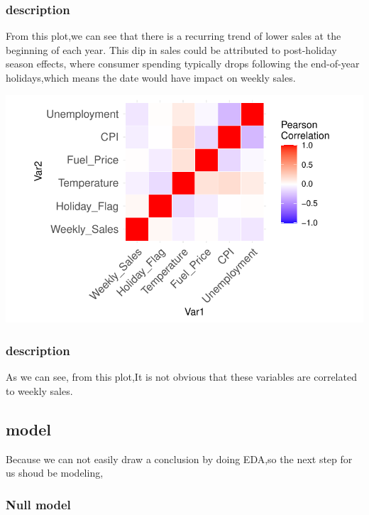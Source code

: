 \documentclass[
  letterpaper,
  DIV=11,
  numbers=noendperiod]{scrartcl}
\begin{document}
\hypertarget{description-3}{%
\subsubsection{description}\label{description-3}}

From this plot,we can see that there is a recurring trend of lower sales
at the beginning of each year. This dip in sales could be attributed to
post-holiday season effects, where consumer spending typically drops
following the end-of-year holidays,which means the date would have
impact on weekly sales.

\includegraphics{678final_files/figure-pdf/matrix-plot-1.pdf}

\hypertarget{description-4}{%
\subsubsection{description}\label{description-4}}

As we can see, from this plot,It is not obvious that these variables are
correlated to weekly sales.

\hypertarget{model}{%
\subsection{model}\label{model}}

Because we can not easily draw a conclusion by doing EDA,so the next
step for us shoud be modeling,

\hypertarget{null-model}{%
\subsubsection{Null model}\label{null-model}}
\end{document}
